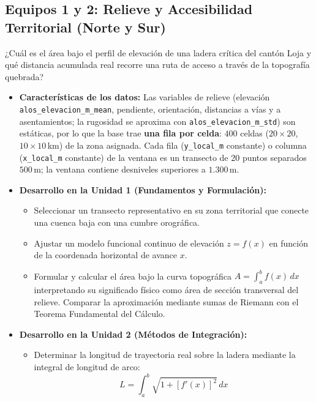 \documentclass[11pt,a4paper]{article}
\begin{document}
\subsection{Equipos 1 y 2: Relieve y Accesibilidad Territorial (Norte y Sur)}
\begin{guidelinebox}[title=Pregunta Guía Central]
¿Cuál es el área bajo el perfil de elevación de una ladera crítica del cantón Loja y qué distancia acumulada real recorre una ruta de acceso a través de la topografía quebrada?
\end{guidelinebox}

\begin{itemize}[leftmargin=*,itemsep=1.5pt]
  \item \textbf{Características de los datos:} Las variables de relieve (elevación \texttt{alos\_elevacion\_m\_mean}, pendiente, orientación, distancias a vías y a asentamientos; la rugosidad se aproxima con \texttt{alos\_elevacion\_m\_std}) son estáticas, por lo que la base trae \textbf{una fila por celda}: $400$ celdas ($20\times20$, $10\times10$\,km) de la zona asignada. Cada fila (\texttt{y\_local\_m} constante) o columna (\texttt{x\_local\_m} constante) de la ventana es un transecto de 20 puntos separados $500$\,m; la ventana contiene desniveles superiores a $1.300$\,m.
  \item \textbf{Desarrollo en la Unidad 1 (Fundamentos y Formulación):}
  \begin{itemize}
    \item Seleccionar un transecto representativo en su zona territorial que conecte una cuenca baja con una cumbre orográfica.
    \item Ajustar un modelo funcional continuo de elevación $z = f(x)$ en función de la coordenada horizontal de avance $x$.
    \item Formular y calcular el área bajo la curva topográfica $A = \int_{a}^{b} f(x)\,dx$ interpretando su significado físico como área de sección transversal del relieve. Comparar la aproximación mediante sumas de Riemann con el Teorema Fundamental del Cálculo.
  \end{itemize}
  \item \textbf{Desarrollo en la Unidad 2 (Métodos de Integración):}
  \begin{itemize}
    \item Determinar la longitud de trayectoria real sobre la ladera mediante la integral de longitud de arco:
    \begin{equation*}
      L = \int_{a}^{b} \sqrt{1 + [f'(x)]^2}\,dx

\end{equation*}
\end{itemize}
\end{itemize}
\end{document}
